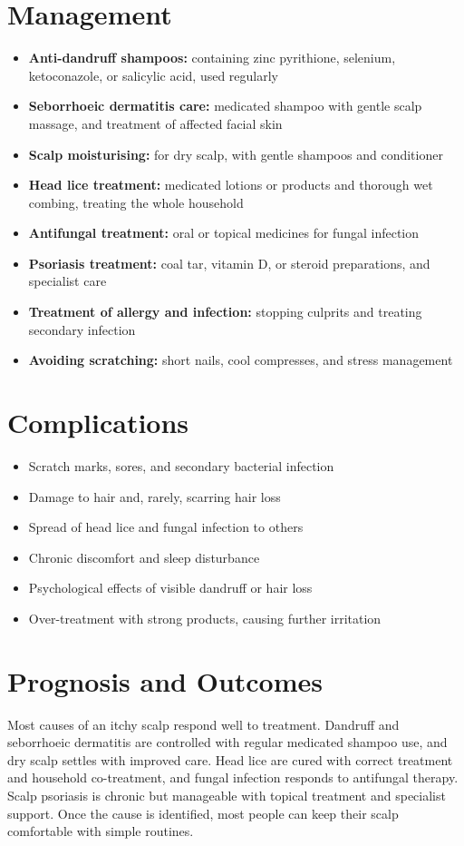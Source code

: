 \section*{Management}
\begin{itemize}
    \item \textbf{Anti-dandruff shampoos:} containing zinc pyrithione, selenium, ketoconazole, or salicylic acid, used regularly
    \item \textbf{Seborrhoeic dermatitis care:} medicated shampoo with gentle scalp massage, and treatment of affected facial skin
    \item \textbf{Scalp moisturising:} for dry scalp, with gentle shampoos and conditioner
    \item \textbf{Head lice treatment:} medicated lotions or products and thorough wet combing, treating the whole household
    \item \textbf{Antifungal treatment:} oral or topical medicines for fungal infection
    \item \textbf{Psoriasis treatment:} coal tar, vitamin D, or steroid preparations, and specialist care
    \item \textbf{Treatment of allergy and infection:} stopping culprits and treating secondary infection
    \item \textbf{Avoiding scratching:} short nails, cool compresses, and stress management
\end{itemize}

\section*{Complications}
\begin{itemize}
    \item Scratch marks, sores, and secondary bacterial infection
    \item Damage to hair and, rarely, scarring hair loss
    \item Spread of head lice and fungal infection to others
    \item Chronic discomfort and sleep disturbance
    \item Psychological effects of visible dandruff or hair loss
    \item Over-treatment with strong products, causing further irritation
\end{itemize}

\section*{Prognosis and Outcomes}
Most causes of an itchy scalp respond well to treatment. Dandruff and seborrhoeic dermatitis are controlled with regular medicated shampoo use, and dry scalp settles with improved care. Head lice are cured with correct treatment and household co-treatment, and fungal infection responds to antifungal therapy. Scalp psoriasis is chronic but manageable with topical treatment and specialist support. Once the cause is identified, most people can keep their scalp comfortable with simple routines.


